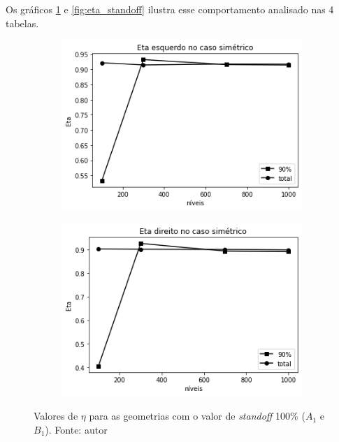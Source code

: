 Os gráficos \ref{fig:eta_simetrico} e \ref{fig:eta_standoff} ilustra esse comportamento analisado nas 4 tabelas.
    
    \begin{figure}[H]
        \centering
        \begin{subfigure}[b]{0.42\linewidth}
    		\includegraphics[width=\linewidth]{img/eta/eta_esquerdo_simetrico.png}
    	\end{subfigure}
    	\begin{subfigure}[b]{0.42\linewidth}
    		\includegraphics[width=\linewidth]{img/eta/eta_direito_simetrico.png}
    	\end{subfigure}
    	\caption{Valores de $\eta$ para as geometrias com o valor de \textit{standoff} 100\% ($A_1$ e $B_1$). Fonte: autor}
    	\label{fig:eta_simetrico}
    \end{figure}
    
